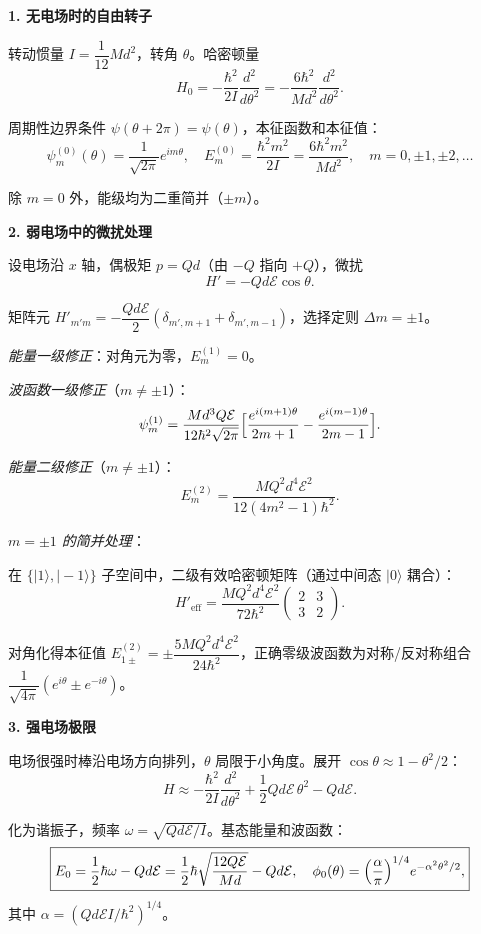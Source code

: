 \begin{derivationbox}[标准解题过程]
\textbf{1. 无电场时的自由转子}

转动惯量 $I=\dfrac{1}{12}Md^2$，转角 $\theta$。哈密顿量
\[
H_0=-\frac{\hbar^2}{2I}\frac{d^2}{d\theta^2}=-\frac{6\hbar^2}{Md^2}\frac{d^2}{d\theta^2}.
\]

周期性边界条件 $\psi(\theta+2\pi)=\psi(\theta)$，本征函数和本征值：
\begin{equation}
\psi_m^{(0)}(\theta)=\frac{1}{\sqrt{2\pi}}e^{im\theta},\quad E_m^{(0)}=\frac{\hbar^2m^2}{2I}=\frac{6\hbar^2m^2}{Md^2},\quad m=0,\pm1,\pm2,\ldots
\end{equation}

除 $m=0$ 外，能级均为二重简并（$\pm m$）。

\textbf{2. 弱电场中的微扰处理}

设电场沿 $x$ 轴，偶极矩 $p=Qd$（由 $-Q$ 指向 $+Q$），微扰
\[
H'=-Qd\mathcal{E}\cos\theta.
\]

矩阵元 $H'_{m'm}=-\dfrac{Qd\mathcal{E}}{2}(\delta_{m',m+1}+\delta_{m',m-1})$，选择定则 $\Delta m=\pm1$。

\textit{能量一级修正}：对角元为零，$E_m^{(1)}=0$。

\textit{波函数一级修正}（$m\neq\pm1$）：
\[
\psi_m^{(1)}=\frac{Md^3Q\mathcal{E}}{12\hbar^2\sqrt{2\pi}}\Bigl[\frac{e^{i(m+1)\theta}}{2m+1}-\frac{e^{i(m-1)\theta}}{2m-1}\Bigr].
\]

\textit{能量二级修正}（$m\neq\pm1$）：
\begin{equation}
E_m^{(2)}=\frac{MQ^2d^4\mathcal{E}^2}{12(4m^2-1)\hbar^2}.
\end{equation}

\textit{$m=\pm1$ 的简并处理}：

在 $\{|1\rangle,|-1\rangle\}$ 子空间中，二级有效哈密顿矩阵（通过中间态 $|0\rangle$ 耦合）：
\[
H'_{\text{eff}}=\frac{MQ^2d^4\mathcal{E}^2}{72\hbar^2}\begin{pmatrix}2&3\\3&2\end{pmatrix}.
\]

对角化得本征值 $E_{1\pm}^{(2)}=\pm\dfrac{5MQ^2d^4\mathcal{E}^2}{24\hbar^2}$，正确零级波函数为对称/反对称组合 $\dfrac{1}{\sqrt{4\pi}}(e^{i\theta}\pm e^{-i\theta})$。

\textbf{3. 强电场极限}

电场很强时棒沿电场方向排列，$\theta$ 局限于小角度。展开 $\cos\theta\approx1-\theta^2/2$：
\[
H\approx-\frac{\hbar^2}{2I}\frac{d^2}{d\theta^2}+\frac12Qd\mathcal{E}\,\theta^2-Qd\mathcal{E}.
\]

化为谐振子，频率 $\omega=\sqrt{Qd\mathcal{E}/I}$。基态能量和波函数：
\begin{equation}
\boxed{E_0=\frac12\hbar\omega-Qd\mathcal{E}=\frac12\hbar\sqrt{\frac{12Q\mathcal{E}}{Md}}-Qd\mathcal{E},\quad\phi_0(\theta)=\Bigl(\frac{\alpha}{\pi}\Bigr)^{1/4}e^{-\alpha^2\theta^2/2},}
\end{equation}
其中 $\alpha=(Qd\mathcal{E}I/\hbar^2)^{1/4}$。
\end{derivationbox}

